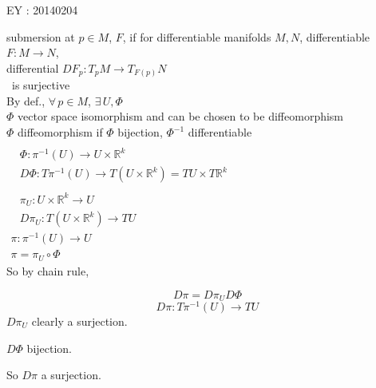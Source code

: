 \documentclass[11pt]{amsart}
\theoremstyle{definition}
\begin{document}
EY : 20140204

submersion at $p \in M$, $F$, if for differentiable manifolds $M, N$, differentiable $F: M \to N$, \\
\quad differential $DF_p : T_p M \to T_{F(p)}N$ \\
\quad \, is surjective \\

By def., $\forall \, p \in M$, $\exists \, U, \Phi$ \\
\quad $\Phi$ vector space isomorphism and can be chosen to be diffeomorphism \\
\quad $\Phi$ diffeomorphism if $\Phi$ bijection, $\Phi^{-1}$ differentiable \\

$\begin{aligned}
& \quad \\
  & \Phi: \pi^{-1}(U) \to U \times \mathbb{R}^k \\
  & D\Phi : T\pi^{-1}(U) \to T(U \times \mathbb{R}^k ) = TU \times T\mathbb{R}^k
\end{aligned}$ \\

$\begin{aligned}
  & \quad \\
  & \pi_U : U \times \mathbb{R}^k \to U \\
  & D\pi_U : T(U \times \mathbb{R}^k ) \to TU \end{aligned}$  \\

$\begin{gathered}
\pi:\pi^{-1}(U) \to U \\
\pi = \pi_U \circ \Phi \end{gathered}$ \\

So by chain rule,

\[
D\pi = D\pi_U D\Phi
\]
\[
D\pi : T\pi^{-1}(U) \to TU
\]
$D\pi_U$ clearly a surjection.

$D\Phi$ bijection.

So $D\pi$ a surjection.

\hrulefill
\end{document}
